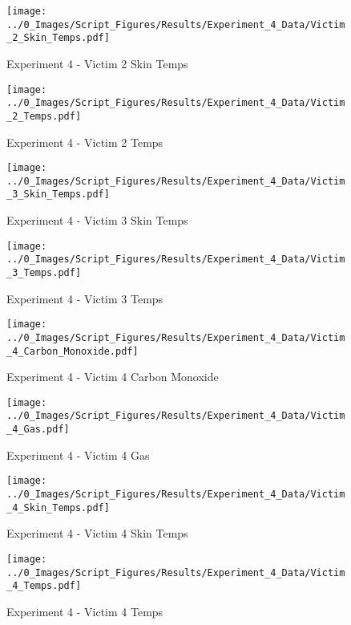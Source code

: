 	\clearpage

	\begin{figure}[H]
		\centering
		\texttt{[image: ../0\_Images/Script\_Figures/Results/Experiment\_4\_Data/Victim\_2\_Skin\_Temps.pdf]}
		\caption[]{Experiment 4 - Victim 2 Skin Temps}
	\end{figure}
 

	\begin{figure}[H]
		\centering
		\texttt{[image: ../0\_Images/Script\_Figures/Results/Experiment\_4\_Data/Victim\_2\_Temps.pdf]}
		\caption[]{Experiment 4 - Victim 2 Temps}
	\end{figure}
 
	\clearpage

	\begin{figure}[H]
		\centering
		\texttt{[image: ../0\_Images/Script\_Figures/Results/Experiment\_4\_Data/Victim\_3\_Skin\_Temps.pdf]}
		\caption[]{Experiment 4 - Victim 3 Skin Temps}
	\end{figure}
 

	\begin{figure}[H]
		\centering
		\texttt{[image: ../0\_Images/Script\_Figures/Results/Experiment\_4\_Data/Victim\_3\_Temps.pdf]}
		\caption[]{Experiment 4 - Victim 3 Temps}
	\end{figure}
 
	\clearpage

	\begin{figure}[H]
		\centering
		\texttt{[image: ../0\_Images/Script\_Figures/Results/Experiment\_4\_Data/Victim\_4\_Carbon\_Monoxide.pdf]}
		\caption[]{Experiment 4 - Victim 4 Carbon Monoxide}
	\end{figure}
 

	\begin{figure}[H]
		\centering
		\texttt{[image: ../0\_Images/Script\_Figures/Results/Experiment\_4\_Data/Victim\_4\_Gas.pdf]}
		\caption[]{Experiment 4 - Victim 4 Gas}
	\end{figure}
 
	\clearpage

	\begin{figure}[H]
		\centering
		\texttt{[image: ../0\_Images/Script\_Figures/Results/Experiment\_4\_Data/Victim\_4\_Skin\_Temps.pdf]}
		\caption[]{Experiment 4 - Victim 4 Skin Temps}
	\end{figure}
 

	\begin{figure}[H]
		\centering
		\texttt{[image: ../0\_Images/Script\_Figures/Results/Experiment\_4\_Data/Victim\_4\_Temps.pdf]}
		\caption[]{Experiment 4 - Victim 4 Temps}
	\end{figure}
 
